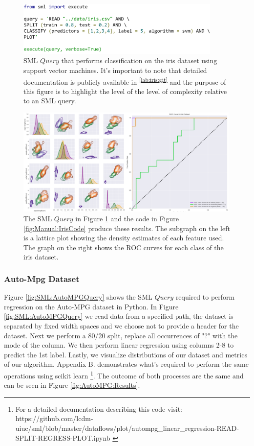 \documentclass[jair,twoside,11pt,theapa]{article}
\begin{document}
\begin{figure}
\includegraphics[width=0.9\textwidth]{figs/iris_sml.png}
\centering
\caption{SML \(Query\) that performs classification on the iris dataset using support vector machines. It's important to note that detailed documentation is publicly available in \textsuperscript{\ref{lab:iris:git}} and the purpose of this figure is to highlight the level of the level of complexity relative to an SML query.}
\label{fig:SML:IrisQuery}
\end{figure}



\begin{figure}
\includegraphics[width=0.99\textwidth]{figs/iris_results.png}
\centering
\caption{The SML \(Query\) in Figure \ref{fig:SML:IrisQuery} and the code in Figure \ref{fig:Manual:IrisCode} produce these results. The subgraph on the left is a lattice plot showing the density estimates of each feature used. The graph on the right shows the ROC curves for each class of the iris dataset.}
\label{fig:IrisResults}
\end{figure}


\subsubsection{Auto-Mpg Dataset}
Figure \ref{fig:SML:AutoMPGQuery} shows the SML \(Query\) required to perform regression on the Auto-MPG dataset in Python. In Figure \ref{fig:SML:AutoMPGQuery} we read data from a specified path, the dataset is separated by fixed width spaces and we choose not to provide a header for the dataset.  Next we perform a 80/20 split, replace all occurrences of "?" with the mode of the column. We then perform linear regression using columns 2-8 to predict the 1st label. Lastly, we visualize distributions of our dataset and metrics of our algorithm. Appendix B. demonstrates what's required to perform the same operations using scikit learn \footnote{For a detailed documentation describing this code visit: https://github.com/lcdm-uiuc/sml/blob/master/dataflows/plot/autompg\_linear\_regression-READ-SPLIT-REGRESS-PLOT.ipynb \label{lab:SML:AUTO}}. The outcome of both processes are the same and can be seen in Figure \ref{fig:AutoMPG:Results}.
\end{document}
